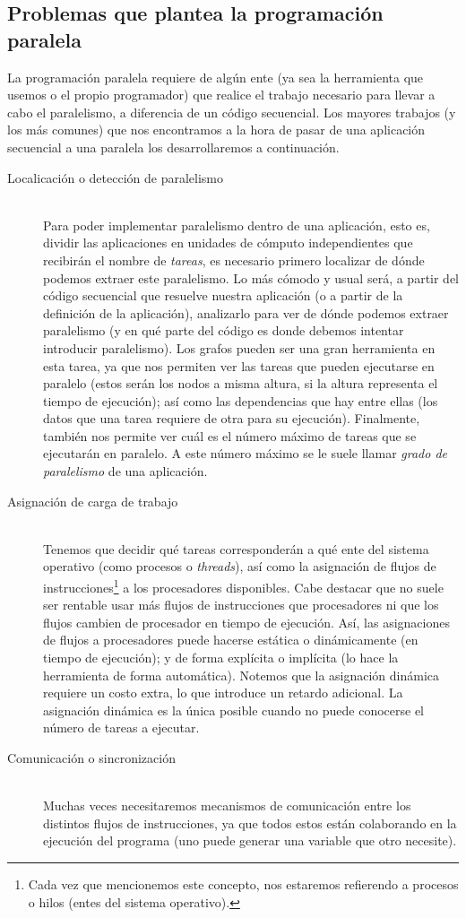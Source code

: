 \subsection{Problemas que plantea la programación paralela}
La programación paralela requiere de algún ente (ya sea la herramienta que usemos o el propio programador) que realice el trabajo necesario para llevar a cabo el paralelismo, a diferencia de un código secuencial. Los mayores trabajos (y los más comunes) que nos encontramos a la hora de pasar de una aplicación secuencial a una paralela los desarrollaremos a continuación.

\begin{description}
    \item [Localicación o detección de paralelismo]~\\
        Para poder implementar paralelismo dentro de una aplicación, esto es, dividir las aplicaciones en unidades de cómputo independientes que recibirán el nombre de \emph{tareas}, es necesario primero localizar de dónde podemos extraer este paralelismo. Lo más cómodo y usual será, a partir del código secuencial que resuelve nuestra aplicación (o a partir de la definición de la aplicación), analizarlo para ver de dónde podemos extraer paralelismo (y en qué parte del código es donde debemos intentar introducir paralelismo). Los grafos pueden ser una gran herramienta en esta tarea, ya que nos permiten ver las tareas que pueden ejecutarse en paralelo (estos serán los nodos a misma altura, si la altura representa el tiempo de ejecución); así como las dependencias que hay entre ellas (los datos que una tarea requiere de otra para su ejecución). Finalmente, también nos permite ver cuál es el número máximo de tareas que se ejecutarán en paralelo. A este número máximo se le suele llamar \emph{grado de paralelismo} de una aplicación.
    \item [Asignación de carga de trabajo]~\\
        Tenemos que decidir qué tareas corresponderán a qué ente del sistema operativo (como procesos o \emph{threads}), así como la asignación de flujos de instrucciones\footnote{Cada vez que mencionemos este concepto, nos estaremos refierendo a procesos o hilos (entes del sistema operativo).} a los procesadores disponibles. Cabe destacar que no suele ser rentable usar más flujos de instrucciones que procesadores ni que los flujos cambien de procesador en tiempo de ejecución. Así, las asignaciones de flujos a procesadores puede hacerse estática o dinámicamente (en tiempo de ejecución); y de forma explícita o implícita (lo hace la herramienta de forma automática). Notemos que la asignación dinámica requiere un costo extra, lo que introduce un retardo adicional. La asignación dinámica es la única posible cuando no puede conocerse el número de tareas a ejecutar. 
    \item [Comunicación o sincronización]~\\
        Muchas veces necesitaremos mecanismos de comunicación entre los distintos flujos de instrucciones, ya que todos estos están colaborando en la ejecución del programa (uno puede generar una variable que otro necesite). 
\end{description}

